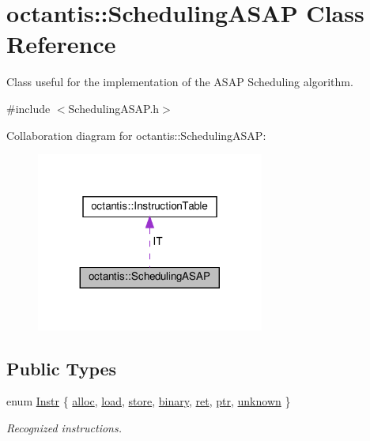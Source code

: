 \hypertarget{classoctantis_1_1SchedulingASAP}{}\section{octantis\+:\+:Scheduling\+A\+S\+AP Class Reference}
\label{classoctantis_1_1SchedulingASAP}


Class useful for the implementation of the A\+S\+AP Scheduling algorithm.  




{\ttfamily \#include $<$Scheduling\+A\+S\+A\+P.\+h$>$}



Collaboration diagram for octantis\+:\+:Scheduling\+A\+S\+AP\+:
\nopagebreak
\begin{figure}[H]
\begin{center}
\leavevmode
\includegraphics[width=212pt]{classoctantis_1_1SchedulingASAP__coll__graph}
\end{center}
\end{figure}
\subsection*{Public Types}
\begin{DoxyCompactItemize}
\item 
enum \hyperlink{classoctantis_1_1SchedulingASAP_abbd454a56c823d34f835168cc31168f4}{Instr} \{ \newline
\hyperlink{classoctantis_1_1SchedulingASAP_abbd454a56c823d34f835168cc31168f4a1541025cbb5cba48df7df02b247dda94}{alloc}, 
\hyperlink{classoctantis_1_1SchedulingASAP_abbd454a56c823d34f835168cc31168f4a243ac5e1764c17c614cd1593d856ded7}{load}, 
\hyperlink{classoctantis_1_1SchedulingASAP_abbd454a56c823d34f835168cc31168f4a825e4d8f229ce85bc8798614cca89237}{store}, 
\hyperlink{classoctantis_1_1SchedulingASAP_abbd454a56c823d34f835168cc31168f4a71eabbb5cc7e271dc91aadc47e10cf97}{binary}, 
\newline
\hyperlink{classoctantis_1_1SchedulingASAP_abbd454a56c823d34f835168cc31168f4a5972668297576ba95cec790b0628aa7a}{ret}, 
\hyperlink{classoctantis_1_1SchedulingASAP_abbd454a56c823d34f835168cc31168f4afe0f5d927cec721c9936f64edb51ad2f}{ptr}, 
\hyperlink{classoctantis_1_1SchedulingASAP_abbd454a56c823d34f835168cc31168f4a5871b82eb2922df94c8bc366c8ad158f}{unknown}
 \}\begin{DoxyCompactList}\small\item\em Recognized instructions. \end{DoxyCompactList}
\end{DoxyCompactItemize}
